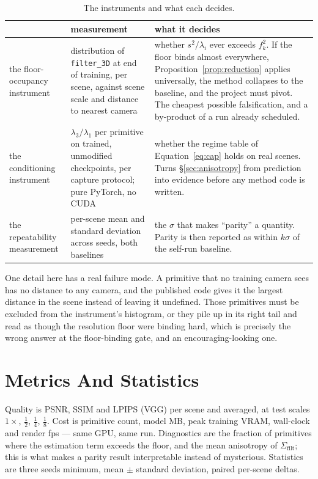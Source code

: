 \begin{table}[htbp]
  \centering
  \caption{The instruments and what each decides.}
  \label{tab:instrumentplan}
  \small
  \begin{tabularx}{\linewidth}{L{0.70}L{1.05}L{1.25}}
    \toprule
    & measurement & what it decides \\
    \midrule
    the floor-occupancy instrument & distribution of \texttt{filter\_3D} at end of training, per scene, against scene scale and distance to nearest camera & whether $s^2/\lambda_i$ ever exceeds $f_k^2$. If the floor binds almost everywhere, Proposition~\ref{prop:reduction} applies universally, the method collapses to the baseline, and the project must pivot. The cheapest possible falsification, and a by-product of a run already scheduled. \\
    the conditioning instrument & $\lambda_3/\lambda_1$ per primitive on trained, unmodified checkpoints, per capture protocol; pure PyTorch, no CUDA & whether the regime table of Equation~\eqref{eq:cap} holds on real scenes. Turns \S\ref{sec:anisotropy} from prediction into evidence before any method code is written. \\
    the repeatability measurement & per-scene mean and standard deviation across seeds, both baselines & the $\sigma$ that makes ``parity'' a quantity. Parity is then reported as within $k\sigma$ of the self-run baseline. \\
    \bottomrule
  \end{tabularx}
\end{table}

One detail here has a real failure mode. A primitive that no training camera
sees has no distance to any camera, and the published code gives it the largest distance in the scene instead of leaving it undefined. Those primitives must be
excluded from the instrument's histogram, or they pile up in its right tail and
read as though the resolution floor were binding hard, which is precisely the
wrong answer at the floor-binding gate, and an encouraging-looking one.

\section{Metrics And Statistics}
Quality is PSNR, SSIM and LPIPS (VGG) per scene and averaged, at test scales
$1\times$, $\tfrac12$, $\tfrac14$, $\tfrac18$. Cost is primitive count, model
MB, peak training VRAM, wall-clock and render fps --- same GPU, same run.
Diagnostics are the fraction of primitives where the estimation term exceeds the
floor, and the mean anisotropy of $\Sigma_{\mathrm{filt}}$; this is what makes a parity result interpretable instead of mysterious. Statistics are three seeds
minimum, mean $\pm$ standard deviation, paired per-scene deltas.

